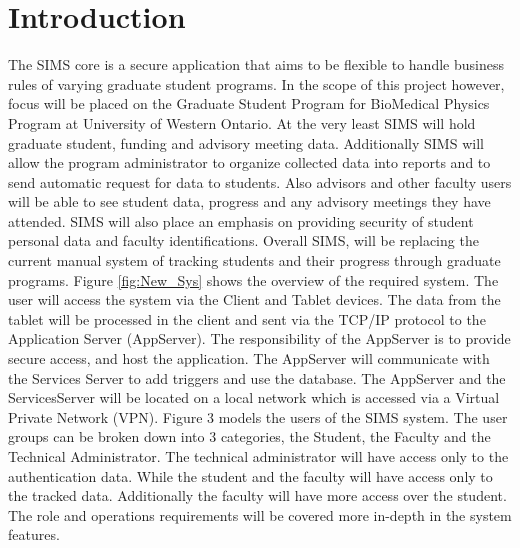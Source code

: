 \documentclass{journal}
\begin{document}
\tableofcontents 

\newpage 

\listoffigures

\newpage

\listoftables

\newpage 

\section{Introduction}
The SIMS core is a secure application that aims to be flexible to handle business rules of varying graduate
student programs. In the scope of this project however, focus will be placed on the Graduate Student
Program for BioMedical Physics Program at University of Western Ontario. At the very least SIMS
will hold graduate student, funding and advisory meeting data. Additionally SIMS will allow the program
administrator to organize collected data into reports and to send automatic request for data to students.
Also advisors and other faculty users will be able to see student data, progress and any advisory meetings
they have attended. SIMS will also place an emphasis on providing security of student personal data and
faculty identifications. Overall SIMS, will be replacing the current manual system of tracking students and
their progress through graduate programs.
Figure \ref{fig:New_Sys} shows the overview of the required system. The user will access the system via the Client and
Tablet devices. The data from the tablet will be processed in the client and sent via the TCP/IP protocol
to the Application Server (AppServer). The responsibility of the AppServer is to provide secure access, and
host the application. The AppServer will communicate with the Services Server to add triggers and use the
database. The AppServer and the ServicesServer will be located on a local network which is accessed via
a Virtual Private Network (VPN). Figure 3 models the users of the SIMS system. The user groups can be
broken down into 3 categories, the Student, the Faculty and the Technical Administrator. The technical
administrator will have access only to the authentication data. While the student and the faculty will have
access only to the tracked data. Additionally the faculty will have more access over the student. The role
and operations requirements will be covered more in-depth in the system features.
\end{document}
